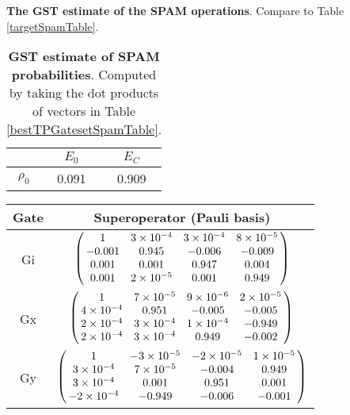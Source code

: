 {\begin{table}[h]
\begin{center}
\caption{\textbf{The GST estimate of the SPAM operations}.  Compare to Table \ref{targetSpamTable}.\label{bestTPGatesetSpamTable}}
\end{center}
\end{table}

\begin{table}[h]
\begin{center}
\begin{tabular}[l]{|c|c|c|}
\hline
 & $E_{0}$ & $E_C$ \\ \hline
$\rho_{0}$ & 0.091 & 0.909 \\ \hline
\end{tabular}

\caption{\textbf{GST estimate of SPAM probabilities}.  Computed by taking the dot products of vectors in Table \ref{bestTPGatesetSpamTable}.\label{bestTPGatesetSpamParametersTable}}
\end{center}
\end{table}

\begin{table}[h]
\begin{center}
\begin{tabular}[l]{|c|c|}
\hline
Gate & Superoperator (Pauli basis) \\ \hline
Gi & $ \left(\!\!\begin{array}{cccc}
1 & 3\times 10^{-4} & 3\times 10^{-4} & 8\times 10^{-5} \\ 
-0.001 & 0.945 & -0.006 & -0.009 \\ 
0.001 & 0.001 & 0.947 & 0.004 \\ 
0.001 & 2\times 10^{-5} & 0.001 & 0.949
 \end{array}\!\!\right) $
 \\ \hline
Gx & $ \left(\!\!\begin{array}{cccc}
1 & 7\times 10^{-5} & 9\times 10^{-6} & 2\times 10^{-5} \\ 
4\times 10^{-4} & 0.951 & -0.005 & -0.005 \\ 
2\times 10^{-4} & 3\times 10^{-4} & 1\times 10^{-4} & -0.949 \\ 
2\times 10^{-4} & 3\times 10^{-4} & 0.949 & -0.002
 \end{array}\!\!\right) $
 \\ \hline
Gy & $ \left(\!\!\begin{array}{cccc}
1 & -3\times 10^{-5} & -2\times 10^{-5} & 1\times 10^{-5} \\ 
3\times 10^{-4} & 7\times 10^{-5} & -0.004 & 0.949 \\ 
3\times 10^{-4} & 0.001 & 0.951 & 0.001 \\ 
-2\times 10^{-4} & -0.949 & -0.006 & -0.001
 \end{array}\!\!\right) $
 \\ \hline
\end{tabular}


\end{center}
\end{table}}
